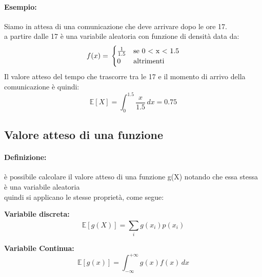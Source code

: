 \documentclass[]{article}
\newcommand{\ev}{\mathbb{E}[X]}
\renewcommand{\ev}[1]{\mathbb{E}[#1]}
\newcommand{\definizione}{\paragraph{Definizione:}}
\begin{document}
    \paragraph{Esempio:} Siamo in attesa di una comunicazione che deve arrivare dopo le ore 17. \\
    a partire dalle 17 è una variabile aleatoria con funzione di densità data da:
    \begin{equation*}
        f(x) = \\
        \begin{cases}
            \frac{1}{1.5} & \text{se 0 < x < 1.5} \\
            0 & \text{altrimenti}
        \end{cases}
    \end{equation*}
    Il valore atteso del tempo che trascorre tra le 17 e il momento di arrivo della comunicazione è quindi:
    \[ \ev{X} = \int_{0}^{1.5} \frac{x}{1.5} \, dx = 0.75\]

    \subsection{Valore atteso di una funzione}
    \definizione è possibile calcolare il valore atteso di una funzione g(X) notando che essa stessa è una variabile aleatoria \\
    quindi si applicano le stesse proprietà, come segue: \\
    \linebreak[4]
    \begin{minipage}{0.45\textwidth}
        \textbf{Variabile discreta:}
        \begin{equation*}
            \ev{g(X)} = \sum_{i}^{} g(x_i) p(x_i)
        \end{equation*}
    \end{minipage}
    \hfill
    \begin{minipage}{0.45\textwidth}
        \textbf{Variabile Continua:}
        \begin{equation*}
            \ev{g(x)} = \int_{-\infty}^{+\infty} g(x) f(x) \, dx
        \end{equation*}
    \end{minipage}
\end{document}
